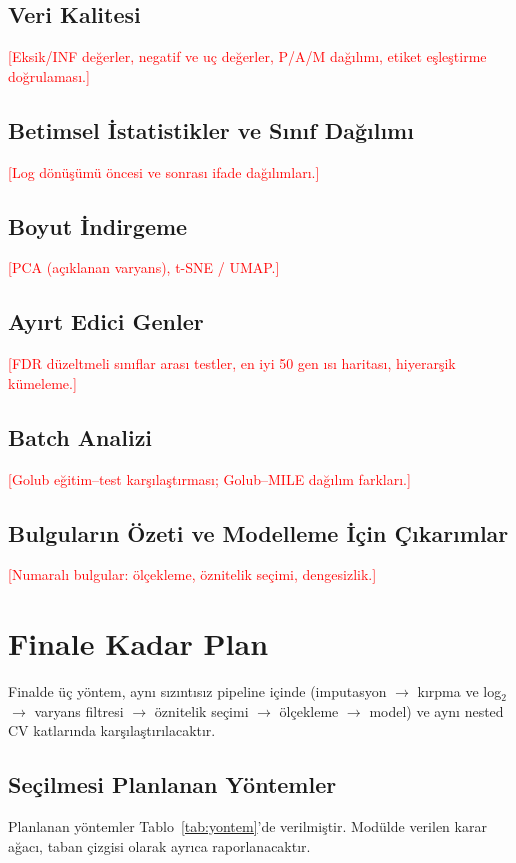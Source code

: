 \documentclass[conference]{IEEEtran}
\newcommand{\todo}[1]{\textcolor{red}{[#1]}}
\begin{document}
\subsection{Veri Kalitesi}
\todo{Eksik/INF değerler, negatif ve uç değerler, P/A/M dağılımı, etiket eşleştirme doğrulaması.}
\subsection{Betimsel İstatistikler ve Sınıf Dağılımı}
\todo{Log dönüşümü öncesi ve sonrası ifade dağılımları.}
\subsection{Boyut İndirgeme}
\todo{PCA (açıklanan varyans), t-SNE / UMAP.}
\subsection{Ayırt Edici Genler}
\todo{FDR düzeltmeli sınıflar arası testler, en iyi 50 gen ısı haritası, hiyerarşik kümeleme.}
\subsection{Batch Analizi}
\todo{Golub eğitim--test karşılaştırması; Golub--MILE dağılım farkları.}
\subsection{Bulguların Özeti ve Modelleme İçin Çıkarımlar}
\todo{Numaralı bulgular: ölçekleme, öznitelik seçimi, dengesizlik.}

\section{Finale Kadar Plan}
Finalde üç yöntem, aynı sızıntısız pipeline içinde (imputasyon $\rightarrow$ kırpma ve log$_2$ $\rightarrow$ varyans filtresi $\rightarrow$ öznitelik seçimi $\rightarrow$ ölçekleme $\rightarrow$ model) ve aynı nested CV katlarında karşılaştırılacaktır.

\subsection{Seçilmesi Planlanan Yöntemler}
Planlanan yöntemler Tablo~\ref{tab:yontem}'de verilmiştir. Modülde verilen karar ağacı, taban çizgisi olarak ayrıca raporlanacaktır.
\end{document}
